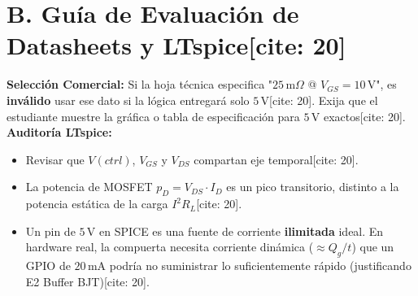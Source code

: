 \documentclass[11pt, a4paper]{article}
\begin{document}
\section*{B. Guía de Evaluación de Datasheets y LTspice[cite: 20]}
\textbf{Selección Comercial:} Si la hoja técnica especifica "$25\,\text{m}\Omega$ @ $V_{GS}=10\,\text{V}$", es \textbf{inválido} usar ese dato si la lógica entregará solo $5\,\text{V}$[cite: 20]. Exija que el estudiante muestre la gráfica o tabla de especificación para $5\,\text{V}$ exactos[cite: 20]. \\
\textbf{Auditoría LTspice:}
\begin{itemize}
    \setlength\itemsep{0.2em}
    \item Revisar que $V(ctrl)$, $V_{GS}$ y $V_{DS}$ compartan eje temporal[cite: 20].
    \item La potencia de MOSFET $p_D = V_{DS} \cdot I_D$ es un pico transitorio, distinto a la potencia estática de la carga $I^2 R_L$[cite: 20].
    \item Un pin de $5\,\text{V}$ en SPICE es una fuente de corriente \textbf{ilimitada} ideal. En hardware real, la compuerta necesita corriente dinámica ($\approx Q_g / t$) que un GPIO de $20\,\text{mA}$ podría no suministrar lo suficientemente rápido (justificando E2 Buffer BJT)[cite: 20].
\end{itemize}
\end{document}
